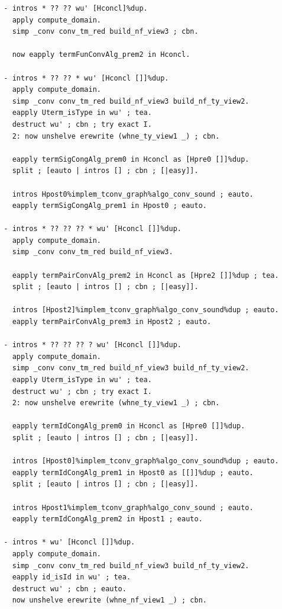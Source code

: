 \begin{lstlisting}
  - intros * ?? ?? wu' [Hconcl]%dup.
    apply compute_domain.
    simp _conv conv_tm_red build_nf_view3 ; cbn.

    now eapply termFunConvAlg_prem2 in Hconcl.

  - intros * ?? ?? * wu' [Hconcl []]%dup.
    apply compute_domain.
    simp _conv conv_tm_red build_nf_view3 build_nf_ty_view2.
    eapply Uterm_isType in wu' ; tea.
    destruct wu' ; cbn ; try exact I.
    2: now unshelve erewrite (whne_ty_view1 _) ; cbn.

    eapply termSigCongAlg_prem0 in Hconcl as [Hpre0 []]%dup.
    split ; [eauto | intros [] ; cbn ; [|easy]].

    intros Hpost0%implem_tconv_graph%algo_conv_sound ; eauto.
    eapply termSigCongAlg_prem1 in Hpost0 ; eauto.

  - intros * ?? ?? ?? * wu' [Hconcl []]%dup.
    apply compute_domain.
    simp _conv conv_tm_red build_nf_view3.

    eapply termPairConvAlg_prem2 in Hconcl as [Hpre2 []]%dup ; tea.
    split ; [eauto | intros [] ; cbn ; [|easy]].

    intros [Hpost2]%implem_tconv_graph%algo_conv_sound%dup ; eauto.
    eapply termPairConvAlg_prem3 in Hpost2 ; eauto.

  - intros * ?? ?? ?? ? wu' [Hconcl []]%dup.
    apply compute_domain.
    simp _conv conv_tm_red build_nf_view3 build_nf_ty_view2.
    eapply Uterm_isType in wu' ; tea.
    destruct wu' ; cbn ; try exact I.
    2: now unshelve erewrite (whne_ty_view1 _) ; cbn.

    eapply termIdCongAlg_prem0 in Hconcl as [Hpre0 []]%dup.
    split ; [eauto | intros [] ; cbn ; [|easy]].

    intros [Hpost0]%implem_tconv_graph%algo_conv_sound%dup ; eauto.
    eapply termIdCongAlg_prem1 in Hpost0 as [[]]%dup ; eauto.
    split ; [eauto | intros [] ; cbn ; [|easy]].

    intros Hpost1%implem_tconv_graph%algo_conv_sound ; eauto.
    eapply termIdCongAlg_prem2 in Hpost1 ; eauto.

  - intros * wu' [Hconcl []]%dup.
    apply compute_domain.
    simp _conv conv_tm_red build_nf_view3 build_nf_ty_view2.
    eapply id_isId in wu' ; tea.
    destruct wu' ; cbn ; eauto.
    now unshelve erewrite (whne_nf_view1 _) ; cbn.


\end{lstlisting}
